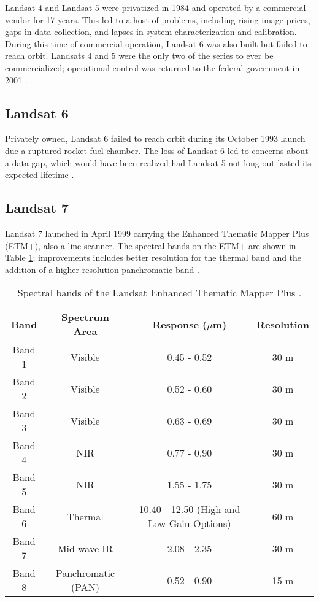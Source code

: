 \documentclass{book}
\begin{document}
Landsat 4 and Landsat 5 were privatized in 1984 and operated by a commercial vendor for 17 years.  This led to a host of problems, including rising image prices, gaps in data collection, and lapses in system characterization and calibration.  During this time of commercial operation, Landsat 6 was also built but failed to reach orbit.  Landsats 4 and 5 were the only two of the series to ever be commercialized; operational control was returned to the federal government in 2001 \cite{landsat_nasa}.

\subsection{Landsat 6}
\label{sec:landsat6}

Privately owned, Landsat 6 failed to reach orbit during its October 1993 launch due a ruptured rocket fuel chamber.  The loss of Landsat 6 led to concerns about a data-gap, which would have been realized had Landsat 5 not long out-lasted its expected lifetime \cite{landsat_nasa}.

\subsection{Landsat 7}
\label{sec:landsat7}

Landsat 7 launched in April 1999 carrying the Enhanced Thematic Mapper Plus (ETM+), also a line scanner.  The spectral bands on the ETM+ are shown in Table \ref{tab:ETMbands}; improvements includes better resolution for the thermal band and the addition of a higher resolution panchromatic band \cite{landsat_usgs}.

\begin{table}[H]
\begin{center}
\begin{tabular}{|c | c | c | c |}
\hline
Band & Spectrum Area & Response ($\mu$m) & Resolution \\ \hline
Band 1 & Visible & 0.45 - 0.52 & 30 m \\ \hline
Band 2 & Visible & 0.52 - 0.60 & 30 m \\ \hline
Band 3 & Visible & 0.63 - 0.69 & 30 m \\ \hline
Band 4 & NIR & 0.77 - 0.90 & 30 m \\ \hline
Band 5 & NIR & 1.55 - 1.75 & 30 m \\ \hline
Band 6 & Thermal & 10.40 - 12.50 (High and Low Gain Options) & 60 m \\ \hline
Band 7 & Mid-wave IR & 2.08 - 2.35 & 30 m \\ \hline
Band 8 & Panchromatic (PAN) & 0.52 - 0.90 & 15 m \\ \hline
\end{tabular}
\caption{Spectral bands of the Landsat Enhanced Thematic Mapper Plus \cite{landsat_usgs}.}
\label{tab:ETMbands}
\end{center}
\end{table}
\end{document}
